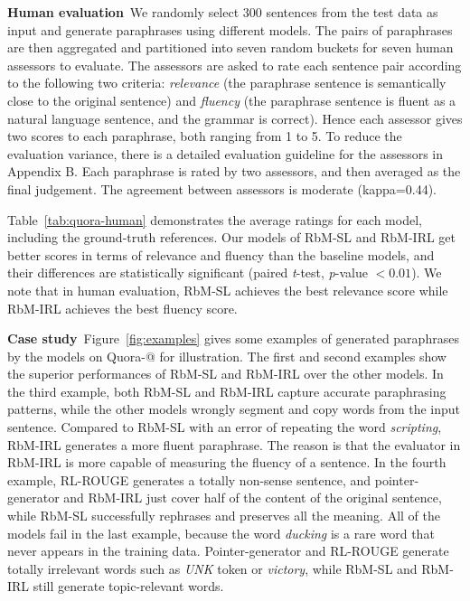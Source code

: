 \documentclass[11pt,a4paper]{article}
\makeatletter
\newcommand{\Rmnum}[1]{\expandafter\@slowromancap\romannumeral #1@}
\makeatother
\begin{document}
    \noindent \textbf{Human evaluation}\  We randomly select 300 sentences from the test data as input and generate paraphrases using different models. The pairs of paraphrases are then aggregated and partitioned into seven random buckets for seven human assessors to evaluate. The assessors are asked to rate each sentence pair according to the following two criteria: \textit{relevance} (the paraphrase sentence is semantically close to the original sentence) and \textit{fluency} (the paraphrase sentence is fluent as a natural language sentence, and the grammar is correct). Hence each assessor gives two scores to each paraphrase, both ranging from 1 to 5. To reduce the evaluation variance, there is a detailed evaluation guideline for the assessors in Appendix B. Each paraphrase is rated by two assessors, and then averaged as the final judgement. The agreement between assessors is moderate (kappa=0.44).

    Table~\ref{tab:quora-human} demonstrates the average ratings for each model, including the ground-truth references. Our models of RbM-SL and RbM-IRL get better scores in terms of relevance and fluency than the baseline models, and their differences are statistically significant (paired \textit{t}-test, \textit{p}-value $< 0.01$). We note that in human evaluation, RbM-SL achieves the best relevance score while RbM-IRL achieves the best fluency score.

    \noindent \textbf{Case study}\  Figure~\ref{fig:examples} gives some examples of generated paraphrases by the models on Quora-\Rmnum{2} for illustration. The first and second examples show the superior performances of RbM-SL and RbM-IRL over the other models. In the third example, both RbM-SL and RbM-IRL capture accurate paraphrasing patterns, while the other models wrongly segment and copy words from the input sentence. Compared to RbM-SL with an error of repeating the word \textit{scripting}, RbM-IRL generates a more fluent paraphrase. The reason is that the evaluator in RbM-IRL is more capable of measuring the fluency of a sentence. In the fourth example, RL-ROUGE generates a totally non-sense sentence, and pointer-generator and RbM-IRL just cover half of the content of the original sentence, while RbM-SL successfully rephrases and preserves all the meaning. All of the models fail in the last example, because the word \textit{ducking} is a rare word that never appears in the training data. Pointer-generator and RL-ROUGE generate totally irrelevant words such as \textit{UNK} token or \textit{victory}, while RbM-SL and RbM-IRL still generate topic-relevant words.
    \vspace{-5pt}
\end{document}
